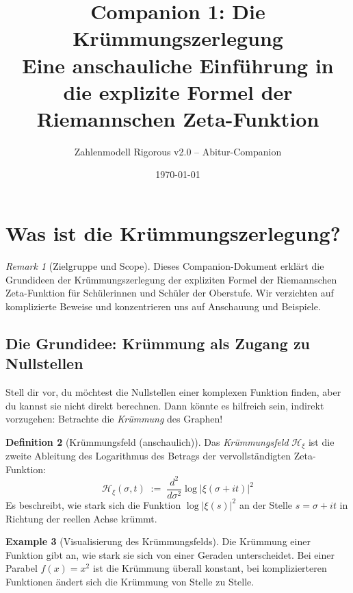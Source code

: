 \documentclass[11pt,a4paper]{article}
\title{Companion 1: Die Kr\"ummungszerlegung\\
	\large Eine anschauliche Einf\"uhrung in die explizite Formel der Riemannschen Zeta-Funktion}
\author{Zahlenmodell Rigorous v2.0 -- Abitur-Companion}
\date{\today}
\newcommand{\Hxi}{\mathcal{H}_{\xi}}
\theoremstyle{definition}
\newtheorem{definition}{Definition}[section]
\newtheorem{example}[definition]{Example}
\theoremstyle{remark}
\newtheorem{remark}[definition]{Remark}
\begin{document}
	\maketitle
	\thispagestyle{empty}
	\tableofcontents
	\clearpage
	
	\section{Was ist die Kr\"ummungszerlegung?}\label{sec:krummung_einfuehrung}
	
	\begin{remark}[Zielgruppe und Scope]
		Dieses Companion-Dokument erkl\"art die Grundideen der Kr\"ummungszerlegung
		der expliziten Formel der Riemannschen Zeta-Funktion f\"ur Sch\"ulerinnen und
		Sch\"uler der Oberstufe. Wir verzichten auf komplizierte Beweise und
		konzentrieren uns auf Anschauung und Beispiele.
	\end{remark}
	
	\subsection{Die Grundidee: Kr\"ummung als Zugang zu Nullstellen}
	
	Stell dir vor, du m\"ochtest die Nullstellen einer komplexen Funktion finden,
	aber du kannst sie nicht direkt berechnen. Dann k\"onnte es hilfreich sein,
	indirekt vorzugehen: Betrachte die \textit{Kr\"ummung} des Graphen!
	
	\begin{definition}[Kr\"ummungsfeld (anschaulich)]
		Das \textit{Kr\"ummungsfeld} $\Hxi$ ist die zweite Ableitung des Logarithmus des
		Betrags der vervollst\"andigten Zeta-Funktion:
		\begin{equation}
			\Hxi(\sigma,t)\;:=\;\frac{d^2}{d\sigma^2}\log\lvert\xi(\sigma+it)\rvert^2
		\end{equation}
		Es beschreibt, wie stark sich die Funktion $\log\lvert\xi(s)\rvert^2$ an der Stelle
		$s = \sigma + it$ in Richtung der reellen Achse kr\"ummt.
	\end{definition}
	
	\begin{example}[Visualisierung des Kr\"ummungsfelds]
		Die Kr\"ummung einer Funktion gibt an, wie stark sie sich von einer Geraden unterscheidet.
		Bei einer Parabel $f(x) = x^2$ ist die Kr\"ummung \"uberall konstant, bei komplizierteren
		Funktionen \"andert sich die Kr\"ummung von Stelle zu Stelle.
	\end{example}
	
\end{document}
